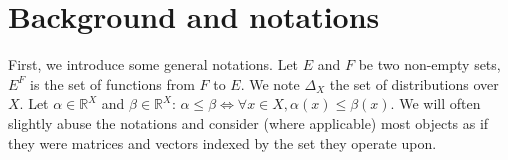 \documentclass[smallextended]{svjour3}
\begin{document}
\section{Background and notations}
\label{sec:background}
First, we introduce some general notations.
Let $E$ and $F$ be two non-empty sets, $E^F$ is the set of functions from $F$ to $E$.
We note $\Delta_X$ the set of distributions over $X$.
Let $\alpha\in\mathbb{R}^X$ and $\beta\in\mathbb{R}^X$: $\alpha\leq\beta \Leftrightarrow \forall x\in X, \alpha(x) \leq \beta(x)$. We will often slightly abuse the notations and consider (where applicable) most objects as if they were matrices and vectors indexed by the set they operate upon.
\end{document}
